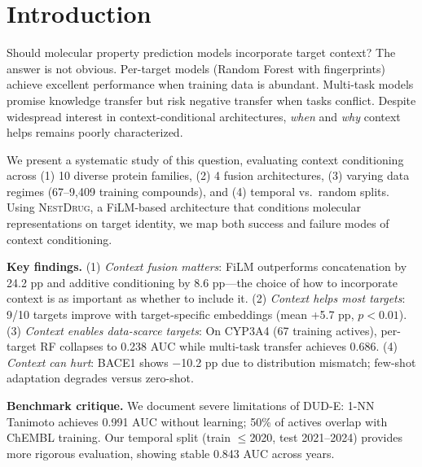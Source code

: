 \documentclass[sigconf,anonymous]{acmart}
\newcommand{\methodname}{\textsc{NestDrug}}
\begin{document}

\maketitle

\section{Introduction}
\label{sec:intro}

Should molecular property prediction models incorporate target context? The answer is not obvious. Per-target models (Random Forest with fingerprints) achieve excellent performance when training data is abundant. Multi-task models promise knowledge transfer but risk negative transfer when tasks conflict. Despite widespread interest in context-conditional architectures, \textit{when} and \textit{why} context helps remains poorly characterized.

We present a systematic study of this question, evaluating context conditioning across (1) 10 diverse protein families, (2) 4 fusion architectures, (3) varying data regimes (67--9,409 training compounds), and (4) temporal vs.\ random splits. Using \methodname{}, a FiLM-based architecture \cite{perez_2018_film} that conditions molecular representations on target identity, we map both success and failure modes of context conditioning.

\textbf{Key findings.} (1) \textit{Context fusion matters}: FiLM outperforms concatenation by 24.2 pp and additive conditioning by 8.6 pp---the choice of how to incorporate context is as important as whether to include it. (2) \textit{Context helps most targets}: 9/10 targets improve with target-specific embeddings (mean +5.7 pp, $p < 0.01$). (3) \textit{Context enables data-scarce targets}: On CYP3A4 (67 training actives), per-target RF collapses to 0.238 AUC while multi-task transfer achieves 0.686. (4) \textit{Context can hurt}: BACE1 shows $-$10.2 pp due to distribution mismatch; few-shot adaptation degrades versus zero-shot.

\textbf{Benchmark critique.} We document severe limitations of DUD-E: 1-NN Tanimoto achieves 0.991 AUC without learning; 50\% of actives overlap with ChEMBL training. Our temporal split (train $\leq$2020, test 2021--2024) provides more rigorous evaluation, showing stable 0.843 AUC across years.
\end{document}
